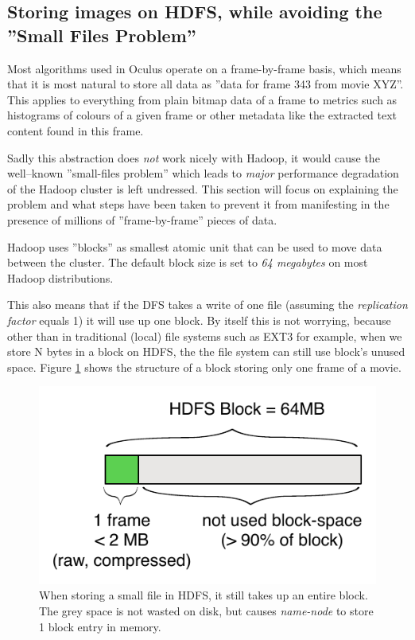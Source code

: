 \subsection{Storing images on HDFS, while avoiding the ''Small Files Problem''}
\label{sec:sequence-files}
Most algorithms used in Oculus operate on a frame-by-frame basis, which means that it is most natural to store all data as ''data for frame 343 from movie XYZ''. This applies to everything from plain bitmap data of a frame to metrics such as histograms of colours of a given frame or other metadata like the extracted text content found in this frame.

Sadly this abstraction does \textit{not} work nicely with Hadoop, it would cause the well--known ''small-files problem'' which leads to \textit{major} performance degradation of the Hadoop cluster is left undressed. This section will focus on explaining the problem and what steps have been taken to prevent it from manifesting in the presence of millions of ''frame-by-frame'' pieces of data.

Hadoop uses ''blocks'' as smallest atomic unit that can be used to move data between the cluster.
The default block size is set to \textit{64 megabytes} on most Hadoop distributions.

This also means that if the DFS takes a write of one file (assuming the \textit{replication factor} equals 1) it will use up one block. By itself this is not worrying, because other than in traditional (local) file systems such as EXT3 for example, when we store N bytes in a block on HDFS,
the the file system can still use block's unused space. Figure \ref{fig:no-sequence-file} shows the structure of a block storing only one frame of a movie.

\begin{figure}[ch!]
  \centering
  \includegraphics[scale=0.9]{diagrams/no-sequence-file.pdf}
  \caption{When storing a small file in HDFS, it still takes up an entire block. The grey space is not wasted on disk, but causes \textit{name-node} to store 1 block entry in memory.}
  \label{fig:no-sequence-file}
\end{figure}


